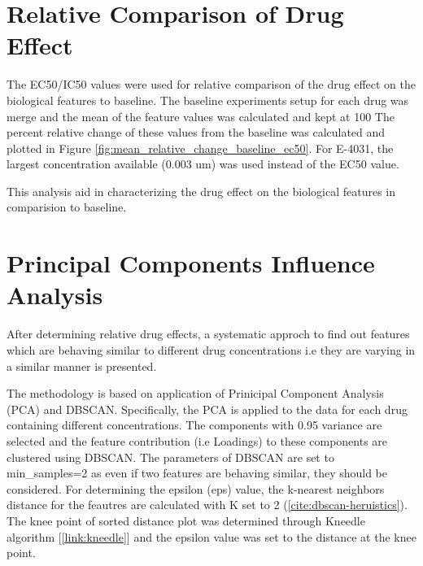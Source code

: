 \section {Relative Comparison of Drug Effect}
\label{sec:relative_comparison}
The EC50/IC50 values were used for relative comparison of the drug effect on the biological features to baseline. The baseline experiments setup for each drug was merge 
and the mean of the feature values was calculated and kept at 100%
The percent relative change of these values from the baseline was calculated and plotted in Figure \ref{fig:mean_relative_change_baseline_ec50}. For E-4031, the largest concentration available (0.003 um) was used instead of the EC50 value. 

This analysis aid in characterizing the drug effect on the biological features in comparision to baseline. 

\section {Principal Components Influence Analysis}
\label{sec:pcia}
After determining relative drug effects, a systematic approch to find out features which are behaving similar to different drug concentrations i.e they are varying in a similar manner is presented.

The methodology is based on application of Prinicipal Component Analysis (PCA) and DBSCAN. Specifically, the PCA is applied to the data for each drug containing different concentrations.
The components with 0.95 variance are selected and the feature contribution (i.e Loadings) to these components are clustered using DBSCAN. 
The parameters of DBSCAN are set to min_samples=2 as even if two features are behaving similar, they should be considered. 
For determining the epsilon (eps) value, the k-nearest neighbors distance for the feautres are calculated with K set to 2 (\ref{cite:dbscan-heruistics}). 
The knee point of sorted distance plot was determined through Kneedle algorithm [\ref{link:kneedle}] and the epsilon value was set to the distance at the knee point.
